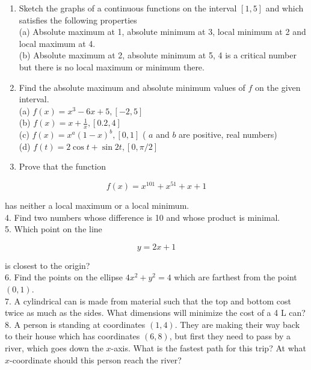 \documentclass[10pt]{article}
\begin{document}
\begin{enumerate}
  \item Sketch the graphs of a continuous functions on the interval $[1,5]$ and which satisfies the following properties\\
(a) Absolute maximum at 1, absolute minimum at 3, local minimum at 2 and local maximum at 4.\\
(b) Absolute maximum at 2, absolute minimum at 5, 4 is a critical number but there is no local maximum or minimum there.
  \item Find the absolute maximum and absolute minimum values of $f$ on the given interval.\\
(a) $f(x)=x^{3}-6 x+5,[-2,5]$\\
(b) $f(x)=x+\frac{1}{x},[0.2,4]$\\
(c) $f(x)=x^{a}(1-x)^{b},[0,1]$ ( $a$ and $b$ are positive, real numbers)\\
(d) $f(t)=2 \cos t+\sin 2 t,[0, \pi / 2]$
  \item Prove that the function
\end{enumerate}

$$
f(x)=x^{101}+x^{51}+x+1
$$

has neither a local maximum or a local minimum.\\
4. Find two numbers whose difference is 10 and whose product is minimal.\\
5. Which point on the line

$$
y=2 x+1
$$

is closest to the origin?\\
6. Find the points on the ellipse $4 x^{2}+y^{2}=4$ which are farthest from the point $(0,1)$.\\
7. A cylindrical can is made from material such that the top and bottom cost twice as much as the sides. What dimensions will minimize the cost of a 4 L can?\\
8. A person is standing at coordinates $(1,4)$. They are making their way back to their house which has coordinates $(6,8)$, but first they need to pass by a river, which goes down the $x$-axis. What is the fastest path for this trip? At what $x$-coordinate should this person reach the river?
\end{document}
